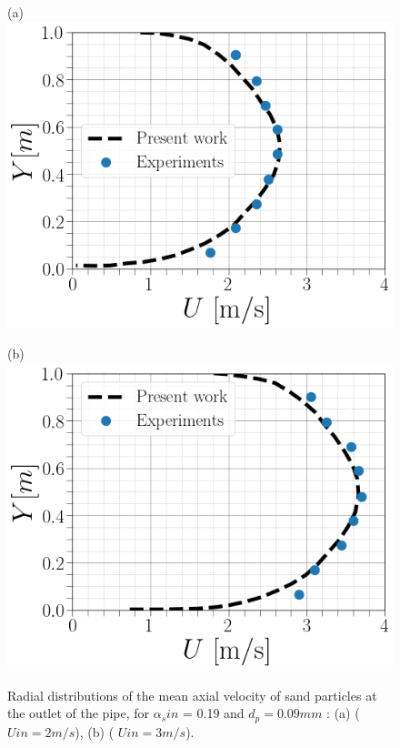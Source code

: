 \documentclass[11pt]{report}
\begin{document}
 \begin{figure}[ht!]
 \begin{center}
 (a)\includegraphics[scale = 0.3]{figs/V22}
 \end{center}
 \end{figure}
%
 \begin{figure}[ht!]
 \begin{center}
 (b)\includegraphics[scale = 0.3]{figs/3CFD}
 \end{center}
 \end{figure}
%
\begin{figure}[ht!]
 \centering
 \caption{Radial distributions of the mean axial velocity of sand particles at the outlet of the pipe, for $\alpha_{s}in$ = 0.19 and $d_p= 0.09 mm$ : (a) ( $Uin = 2 m/s$), (b) ( $Uin = 3 m/s$).}\label{U}
 \end{figure}
\end{document}
